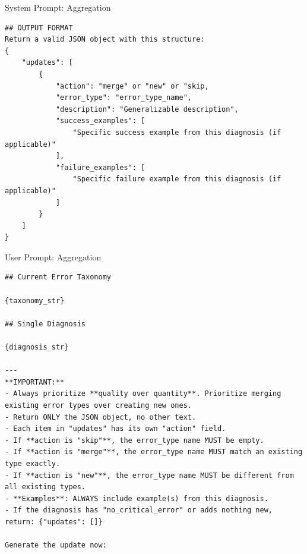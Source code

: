 \begin{SysPromptBox}{System Prompt: Aggregation}
\begin{lstlisting}
## OUTPUT FORMAT
Return a valid JSON object with this structure:
{
    "updates": [
        {
            "action": "merge" or "new" or "skip,
            "error_type": "error_type_name",
            "description": "Generalizable description",
            "success_examples": [
                "Specific success example from this diagnosis (if applicable)"
            ],
            "failure_examples": [
                "Specific failure example from this diagnosis (if applicable)"
            ]
        }
    ]
}
\end{lstlisting}
\end{SysPromptBox}

\begin{UserPromptBox}{User Prompt: Aggregation}
\begin{lstlisting}
## Current Error Taxonomy

{taxonomy_str}

## Single Diagnosis

{diagnosis_str}

---
**IMPORTANT:**
- Always prioritize **quality over quantity**. Prioritize merging existing error types over creating new ones.
- Return ONLY the JSON object, no other text.
- Each item in "updates" has its own "action" field.
- If **action is "skip"**, the error_type name MUST be empty.
- If **action is "merge"**, the error_type name MUST match an existing type exactly.
- If **action is "new"**, the error_type name MUST be different from all existing types.
- **Examples**: ALWAYS include example(s) from this diagnosis.
- If the diagnosis has "no_critical_error" or adds nothing new, return: {"updates": []}

Generate the update now:




\end{lstlisting}
\end{UserPromptBox}